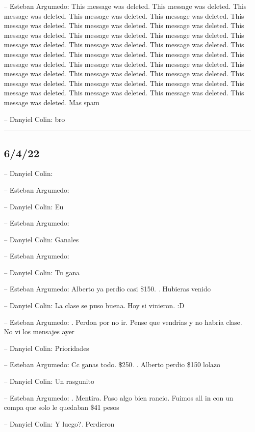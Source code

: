 -- Esteban Argumedo: This message was deleted. This message was deleted.
This message was deleted. This message was deleted. This message was
deleted. This message was deleted. This message was deleted. This
message was deleted. This message was deleted. This message was deleted.
This message was deleted. This message was deleted. This message was
deleted. This message was deleted. This message was deleted. This
message was deleted. This message was deleted. This message was deleted.
This message was deleted. This message was deleted. This message was
deleted. This message was deleted. This message was deleted. This
message was deleted. This message was deleted. This message was deleted.
This message was deleted. This message was deleted. This message was
deleted. This message was deleted. Mas spam

-- Danyiel Colin: bro

\begin{center}\rule{0.5\linewidth}{0.5pt}\end{center}

\hypertarget{section-94}{%
\subsection{6/4/22}\label{section-94}}

-- Danyiel Colin:

-- Esteban Argumedo:

-- Danyiel Colin: Eu

-- Esteban Argumedo:

-- Danyiel Colin: Ganales

-- Esteban Argumedo:

-- Danyiel Colin: Tu gana

-- Esteban Argumedo: Alberto ya perdio casi \$150. . Hubieras venido

-- Danyiel Colin: La clase se puso buena. Hoy si vinieron. :D

-- Esteban Argumedo: . Perdon por no ir. Pense que vendrias y no habria
clase. No vi los mensajes ayer

-- Danyiel Colin: Prioridades

-- Esteban Argumedo: Cc ganas todo. \$250. . Alberto perdio \$150 lolazo

-- Danyiel Colin: Un rasgunito

-- Esteban Argumedo: . Mentira. Paso algo bien rancio. Fuimos all in con
un compa que solo le quedaban \$41 pesos

-- Danyiel Colin: Y luego?. Perdieron

